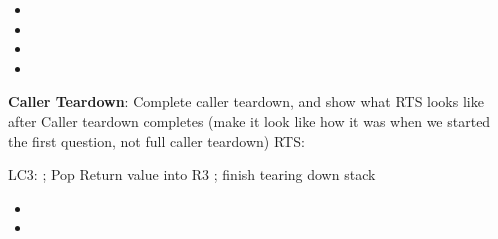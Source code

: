 \documentclass{article}
\begin{document}
\begin{enumerate}[label=(\alph*), itemsep = 120pt]
\begin{itemize}
    \item 
    \item 
    \item 
    \item
\end{itemize}


    \textbf{Caller Teardown}: Complete caller teardown, and show what RTS looks like after Caller teardown completes (make it look like how it was when we started the first question, not full caller teardown)
    \newline
RTS:
    \newline
    \newline
    \newline
    \newline
    \newline
    \newline
    \newline






LC3:
\newline
; Pop Return value into R3
\newline
; finish tearing down stack 
 \begin{itemize}
    \item 
    \item 
    
\end{itemize}

\end{enumerate}
\newpage
\end{document}
